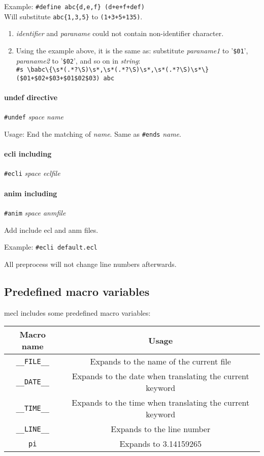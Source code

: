 \documentclass{article}
\begin{document}
Example: \verb|#define abc{d,e,f} (d+e+f+def)| \\ Will substitute \verb|abc{1,3,5}| to \verb|(1+3+5+135)|.

\begin{enumerate}
	\item \textit{identifier} and \textit{paraname} could not contain non-identifier character.
	\item Using the example above, it is the same as: substitute \textit{paraname1} to '\verb|$01|', \textit{paraname2} to '\verb|$02|', and so on in \textit{string}: \\
	\verb|#s \babc\{\s*(.*?\S)\s*,\s*(.*?\S)\s*,\s*(.*?\S)\s*\} ($01+$02+$03+$01$02$03) abc|
\end{enumerate}

\paragraph{undef directive} \verb|#undef| \textit{space name}

Usage: End the matching of \textit{name}. Same as \verb|#ends| \textit{name}.

\paragraph{ecli including} \verb|#ecli| \textit{space eclfile}
\paragraph{anim including} \verb|#anim| \textit{space anmfile}

Add include ecl and anm files.

Example: \verb|#ecli default.ecl|

All preprocess will not change line numbers afterwards.

\subsection{Predefined macro variables}

mecl includes some predefined macro variables:

\begin{table}[H]
	\centering
	\begin{tabular}{c|c}
		\hline
		Macro name & Usage \\\hline
		\verb|__FILE__| & Expands to the name of the current file \\\hline
		\verb|__DATE__| & Expands to the date when translating the current keyword \\\hline
		\verb|__TIME__| & Expands to the time when translating the current keyword \\\hline
		\verb|__LINE__| & Expands to the line number \\\hline
		\verb|pi| & Expands to 3.14159265 \\\hline
	\end{tabular}
\end{table}
\end{document}
